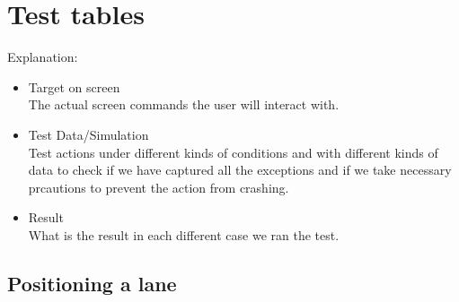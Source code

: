 \newcommand{\pass}{[\sethlcolor{green}\hl{PASS}] / [\sethlcolor{red}\hl{FAIL}]}
\section{Test tables}
Explanation: 
\begin{itemize}
	\item Target on screen\\
	The actual screen commands the user will interact with.
	\item Test Data/Simulation\\
	Test actions under different kinds of conditions and with different kinds of data to check if we have captured all the exceptions and if we take necessary prcautions to prevent the action from crashing.
	\item Result\\
	What is the result in each different case we ran the test.
\end{itemize}

\newpage

\subsection{Positioning a lane}

